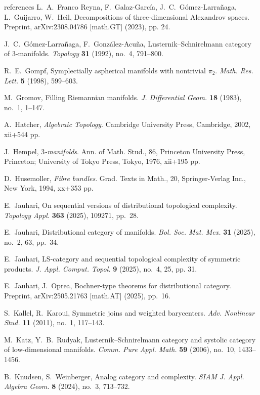 \documentclass[amscd,amssymb,verbatim,11pt]{amsart}
\theoremstyle{plain}
\theoremstyle{definition}
\begin{document}
\begin{thebibliography}{references}
 L.~A.~Franco Reyna, F.~Galaz-García, J.~C.~G\'omez-Larra\~naga, L.~Guijarro, W.~Heil, Decompositions of three-dimensional Alexandrov spaces. Preprint, arXiv:2308.04786 [math.GT] (2023), pp. 24.

 J.~C.~G\'omez-Larra\~naga, F.~Gonz\'alez-Acu\~na, Lusternik--Schnirelmann category of $3$-manifolds. \emph{Topology} \textbf{31} (1992), no.~4, 791--800.

 R.~E.~Gompf, Symplectially aspherical manifolds with nontrivial $\pi_2$. \emph{Math. Res. Lett.} \textbf{5} (1998), 599--603.

 M.~Gromov, Filling Riemannian manifolds. \emph{J. Differential Geom.} \textbf{18} (1983), no.~1, 1--147.

 A.~Hatcher, \emph{Algebraic {T}opology}. Cambridge University Press, 
Cambridge, 2002, xii+544 pp.

 J.~Hempel, \emph{$3$-manifolds}. Ann. of Math. Stud., 86, Princeton University Press, Princeton; University of Tokyo Press, Tokyo, 1976, xii+195 pp.

 D.~Husemoller, \emph{Fibre bundles}. Grad. Texts in Math., 20, Springer-Verlag Inc., New York, 1994, xx+353 pp.

 E.~Jauhari, On sequential versions of distributional topological complexity. \emph{Topology Appl.} \textbf{363} (2025), 109271, pp.~28.

 E.~Jauhari, Distributional category of manifolds. \emph{Bol. Soc. Mat. Mex.} \textbf{31} (2025), no.~2, 63, pp.~34.

 E.~Jauhari, LS-category and sequential topological complexity of symmetric products. \emph{J. Appl. Comput. Topol.} \textbf{9} (2025), no.~4, 25, pp. 31.

 E.~Jauhari, J.~Oprea, Bochner-type theorems for distributional category. Preprint, arXiv:2505.21763 [math.AT] (2025), pp.~16.

 S.~Kallel, R.~Karoui, Symmetric joins and weighted barycenters. \emph{Adv. Nonlinear Stud.} \textbf{11} (2011), no.~1, 117--143.

 M.~Katz, Y.~B.~Rudyak, Lusternik--Schnirelmann category and systolic category of low-dimensional manifolds. \emph{Comm. Pure Appl. Math.} \textbf{59} (2006), no.~10, 1433--1456.

 B.~Knudsen, S.~Weinberger, Analog category and complexity. \emph{SIAM J. Appl. Algebra Geom.} \textbf{8} (2024), no.~3, 713--732.


\end{thebibliography}
\end{document}
